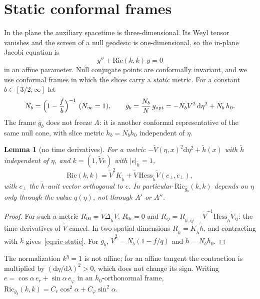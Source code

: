 \documentclass[aip,jmp,amsmath,amssymb,reprint]{revtex4-2}
\newcommand{\dd}{\mathrm{d}}
\newcommand{\gopt}{g_{\rm opt}}
\theoremstyle{plain}
\newtheorem{lemma}[proposition]{Lemma}
\theoremstyle{definition}
\begin{document}
\section{Static conformal frames}
\label{sec:frames}
In the plane the auxiliary spacetime is three-dimensional. Its Weyl tensor vanishes and
the screen of a null geodesic is one-dimensional, so the in-plane Jacobi equation is
\begin{equation}
  y''+\mathrm{Ric}(k,k)\,y=0
  \label{eq:jacobi-3d}
\end{equation}
in an affine parameter. Null conjugate points are conformally invariant, and we use
conformal frames in which the slices carry a \emph{static} metric. For a constant
$b\in[3/2,\infty]$ let
\begin{equation}
  N_b=\Big(1-\frac fb\Big)^{-1}\ (N_\infty=1),\qquad
  \bar g_b=\frac{N_b}{N}\,\gopt=-N_bV^2\,\dd\eta^2+N_b\,h_0 .
  \label{eq:gb}
\end{equation}
The frame $\bar g_b$ does not freeze $A$: it is another conformal representative of the
same null cone, with slice metric $h_b=N_bh_0$ independent of $\eta$.

\begin{lemma}[no time derivatives]\label{lem:static-frame}
For a metric $-\tilde V(\eta,x)^2\dd\eta^2+\tilde h(x)$ with $\tilde h$ independent of
$\eta$, and $k=(1,\tilde V e)$ with $|e|_{\tilde h}=1$,
\begin{equation}
  \mathrm{Ric}(k,k)=\tilde V^2K_{\tilde h}+\tilde V\,\mathrm{Hess}_{\tilde h}\tilde V(e_\perp,e_\perp),
  \label{eq:ric-static}
\end{equation}
with $e_\perp$ the $\tilde h$-unit vector orthogonal to $e$. In particular
$\mathrm{Ric}_{\bar g_b}(k,k)$ depends on $\eta$ only through the value $q(\eta)$, not
through $A'$ or $A''$.
\end{lemma}

\begin{proof}
For such a metric $R_{00}=\tilde V\Delta_{\tilde h}\tilde V$, $R_{0i}=0$ and
$R_{ij}=R_{\tilde h,ij}-\tilde V^{-1}\mathrm{Hess}_{\tilde h}\tilde V_{ij}$: the time
derivatives of $\tilde V$ cancel. In two spatial dimensions
$R_{\tilde h}=K_{\tilde h}\tilde h$, and contracting with $k$ gives~\eqref{eq:ric-static}.
For $\bar g_b$, $\tilde V^2=N_b(1-f/q)$ and $\tilde h=N_bh_0$.
\end{proof}

The normalization $k^\eta=1$ is not affine; for an affine tangent the contraction is
multiplied by $(\dd\eta/\dd\lambda)^2>0$, which does not change its sign. Writing
$e=\cos\alpha\,e_r+\sin\alpha\,e_\varphi$ in an $h_0$-orthonormal frame,
$\mathrm{Ric}_{\bar g_b}(k,k)=C_r\cos^2\alpha+C_\varphi\sin^2\alpha$.
\end{document}
